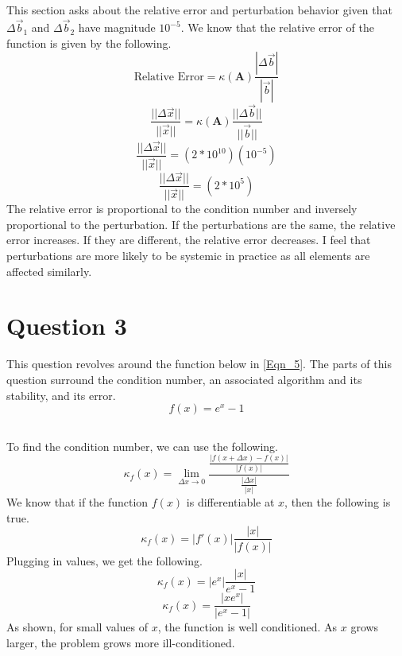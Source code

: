 \documentclass{article}
\begin{document}
\subsection{}
This section asks about the relative error and perturbation behavior given that \(\Delta\vec{b}_1\) and \(\Delta\vec{b}_2\) have magnitude \(10^{-5}\).
We know that the relative error of the function is given by the following.
\[
\mbox{Relative Error} = \kappa(\textbf{A})\frac{|\Delta\vec{b}|}{|\vec{b}|}
\]
\[
\frac{||\Delta\vec{x}||}{||\vec{x}||} = \kappa(\textbf{A})\frac{||\Delta\vec{b}||}{||\vec{b}||}
\]
\[
\frac{||\Delta\vec{x}||}{||\vec{x}||} = (2*10^{10})(10^{-5})
\]
\[
\frac{||\Delta\vec{x}||}{||\vec{x}||} = (2*10^{5})
\]
The relative error is proportional to the condition number and inversely proportional to the perturbation. If the perturbations are the same, the relative error increases. If they are different, the relative error decreases. I feel that perturbations are more likely to be systemic in practice as all elements are affected similarly.

\section{Question 3}
This question revolves around the function below in  \ref{Eqn_5}. The parts of this question surround the condition number, an associated algorithm and its stability, and its error.
\begin{equation}
    \label{Eqn_5}
    f(x) = e^x-1
\end{equation}
\subsection{}
To find the condition number, we can use the following.
\[
\kappa_f(x) = \lim_{\Delta x \to 0}\frac{\frac{|f(x+\Delta x)-f(x)|}{|f(x)|}}{\frac{|\Delta x|}{|x|}}
\]
We know that if the function \(f(x)\) is differentiable at \(x\), then the following is true.
\[
\kappa_f (x) = |f'(x)|\frac{|x|}{|f(x)|}
\]
Plugging in values, we get the following.
\[
\kappa_f (x) = |e^x|\frac{|x|}{e^x-1}
\]
\[
\kappa_f (x) = \frac{|xe^x|}{|e^x-1|}
\]
As shown, for small values of \(x\), the function is well conditioned. As \(x\) grows larger, the problem grows more ill-conditioned.
\end{document}
